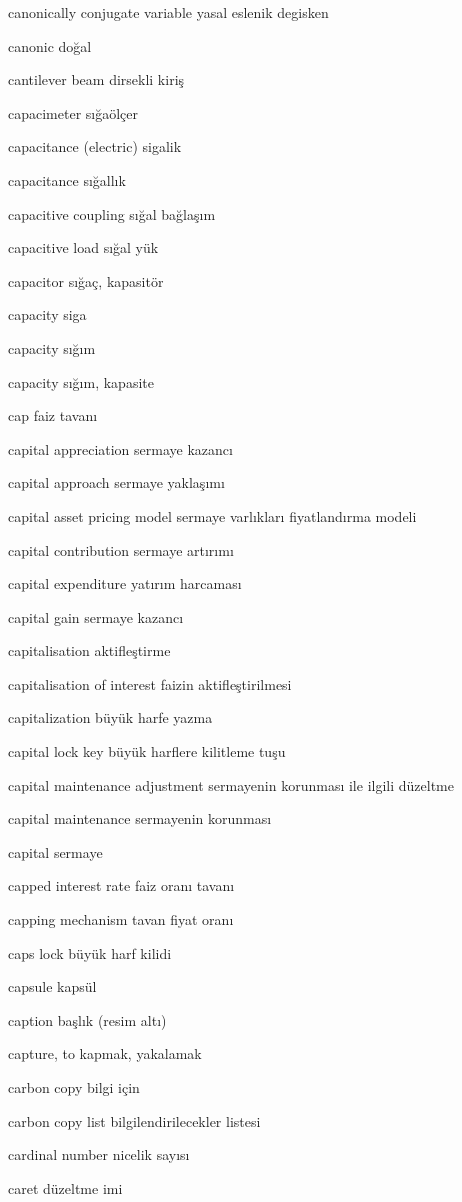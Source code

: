 \documentclass[12pt,fleqn]{article}\usepackage{../../common}
\begin{document}
canonically conjugate variable yasal eslenik degisken

canonic doğal

cantilever beam dirsekli kiriş

capacimeter sığaölçer

capacitance (electric) sigalik

capacitance sığallık

capacitive coupling sığal bağlaşım

capacitive load sığal yük

capacitor sığaç, kapasitör

capacity siga

capacity sığım

capacity sığım, kapasite

cap faiz tavanı

capital appreciation sermaye kazancı

capital approach sermaye yaklaşımı

capital asset pricing model sermaye varlıkları fiyatlandırma modeli

capital contribution sermaye artırımı

capital expenditure yatırım harcaması

capital gain sermaye kazancı

capitalisation aktifleştirme

capitalisation of interest faizin aktifleştirilmesi

capitalization büyük harfe yazma

capital lock key büyük harflere kilitleme tuşu

capital maintenance adjustment sermayenin korunması ile ilgili düzeltme

capital maintenance sermayenin korunması

capital sermaye

capped interest rate faiz oranı tavanı

capping mechanism tavan fiyat oranı

caps lock büyük harf kilidi

capsule kapsül

caption başlık (resim altı)

capture, to kapmak, yakalamak

carbon copy bilgi için

carbon copy list bilgilendirilecekler listesi

cardinal number nicelik sayısı

caret düzeltme imi
\end{document}
